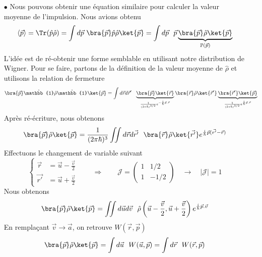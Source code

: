 \begin{itemize}
\item[$\bullet$] Nous pouvons obtenir une équation similaire pour calculer la valeur moyenne de l'impulsion. Nous avions obtenu
\begin{equation}
\langle\vec{p}\rangle = \Tr(\hat{p}\hat{\rho}) = \int d\vec{p}\ \bra{\vec{p}}\hat{p}\hat{\rho}\ket{\vec{p}} =
\int d\vec{p}\ \ \vec{p}\underbrace{\bra{\vec{p}}\hat{\rho}\ket{\vec{p}}}_{\mathbb{P}(\vec{p})}
\end{equation}
L'idée est de ré-obtenir une forme semblable en utilisant notre distribution de Wigner. Pour se faire, partons de la 
définition de la valeur moyenne de $\hat{\rho}$ et utilisons la relation de fermeture
\begin{equation}
\bra{\vec{p}}\hat{\mathbb{1}}\hat{\rho}\hat{\mathbb{1}}\ket{\vec{p}}= \int d\vec{r}d\vec{r}'\ \ 
\underbrace{\bra{\vec{p}}\ket{\vec{r}}}_{\frac{1}{(2\pi\hbar)^{3/2}}e^{-\frac{i}{\hbar}\vec{p}.\vec{r}}}\bra{\vec{r}}\hat{\rho}\ket{\vec{r}'}\underbrace{\bra{\vec{r}'}\ket{\vec{p}}}_{\frac{1}{(2\pi\hbar)^{3/2}}e^{
\frac{i}{\hbar}\vec{p}.\vec{r}}}
\label{eq:ReecritVMRho}
\end{equation}
Après ré-écriture, nous obtenons
\begin{equation}
\bra{\vec{p}}\hat{\rho}\ket{\vec{p}}=\frac{1}{(2\pi\hbar)^3}\iint d\vec{r}d\vec{r'}\ \
\bra{\vec{r}}\hat{\rho}\ket{\vec{r'}}e^{\frac{i}{\hbar}\vec{p}(\vec{r'}-\vec{r})}
\end{equation}
Effectuons le changement de variable suivant
\begin{equation}
\left\{\begin{array}{ll}
\vec{r} &= \vec{u}-\frac{\vec{v}}{2}\\
\vec{r'} &= \vec{u}+\frac{\vec{v}}{2}
\end{array}\right.\qquad\Rightarrow\qquad \mathcal{J} = \left(\begin{array}{cc}
1&1/2\\
1&-1/2
\end{array}\right)\quad \rightarrow\quad |\mathcal{J}| = 1
\end{equation}
Nous obtenons
\begin{equation}
\bra{\vec{p}}\hat{\rho}\ket{\vec{p}}= \iint d\vec{u}d\vec{v}\ \ \hat{\rho}\left(\vec{u}-\frac{\vec{v}}{2},
\vec{u}+\frac{\vec{v}}{2}\right)e^{\frac{i}{\hbar}\vec{p}.\vec{v}}
\end{equation}
En remplaçant $\vec{v}\to\vec{a}$, on retrouve $W(\vec{r},\vec{p})$
\begin{equation}
\bra{\vec{p}}\hat{\rho}\ket{\vec{p}}=\int d\vec{u}\ \ W(\vec{u},\vec{p}) = \int d\vec{r}\ \ W(\vec{r},\vec{p})

\end{equation}
\end{itemize}
